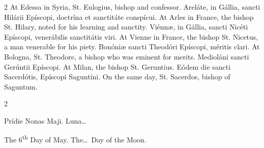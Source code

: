 \begin{paracol}{2}
At Edessa in Syria, St. Eulogius, 
 bishop and confessor.
\switchcolumn*
{}
Areláte, in Gállia, 
 sancti Hilárii Epíscopi, doctrína et sanctitáte conspícui.
\switchcolumn
{}
At Arles in France, the bishop St. 
 Hilary, noted for his learning and sanctity.
\switchcolumn*
{}
Viénnæ, in Gállia, 
 sancti Nicéti Epíscopi, venerábilis sanctitátis viri.
\switchcolumn
{}
At Vienne in France, the bishop St. 
 Nicetus, a man venerable for his piety.
\switchcolumn*
{}
Bonóniæ sancti 
 Theodóri Epíscopi, méritis clari.
\switchcolumn
{}
At Bologna, St. Theodore, a bishop 
 who was eminent for merits.
\switchcolumn*
{}
Medioláni sancti 
 Gerúntii Epíscopi.
\switchcolumn
{}
At Milan, the bishop St. Geruntius.
\switchcolumn*
{}
Eódem die sancti 
 Sacerdótis, Epíscopi Saguntíni.
\switchcolumn
{}
On the same day, St. Sacerdos, 
 bishop of Saguntum.
\switchcolumn*
{}
\end{paracol}


\begin{paracol}{2}
\begin{center}{\color{gregoriocolor} Prídie Nonas Maji. 
 Luna\dots\ }\end{center}
\switchcolumn
{}
\begin{center}{\color{gregoriocolor} The 
 6\textsuperscript{th} Day of May. The\dots\ Day of the Moon.}\end{center}
\end{paracol}

